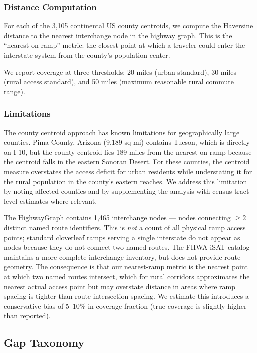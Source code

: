 \subsubsection{Distance Computation}

For each of the 3,105 continental US county centroids, we compute the Haversine distance to the nearest interchange node in the highway graph. This is the ``nearest on-ramp'' metric: the closest point at which a traveler could enter the interstate system from the county's population center.

We report coverage at three thresholds: 20 miles (urban standard), 30 miles (rural access standard), and 50 miles (maximum reasonable rural commute range).

\subsubsection{Limitations}

The county centroid approach has known limitations for geographically large counties. Pima County, Arizona (9,189 sq mi) contains Tucson, which is directly on I-10, but the county centroid lies 189 miles from the nearest on-ramp because the centroid falls in the eastern Sonoran Desert. For these counties, the centroid measure overstates the access deficit for urban residents while understating it for the rural population in the county's eastern reaches. We address this limitation by noting affected counties and by supplementing the analysis with census-tract-level estimates where relevant.

The HighwayGraph contains 1,465 interchange nodes --- nodes connecting $\geq 2$ distinct named route identifiers. This is \textit{not} a count of all physical ramp access points; standard cloverleaf ramps serving a single interstate do not appear as nodes because they do not connect two named routes. The FHWA iSAT catalog maintains a more complete interchange inventory, but does not provide route geometry. The consequence is that our nearest-ramp metric is the nearest point at which two named routes intersect, which for rural corridors approximates the nearest actual access point but may overstate distance in areas where ramp spacing is tighter than route intersection spacing. We estimate this introduces a conservative bias of 5--10\% in coverage fraction (true coverage is slightly higher than reported).

\subsection{Gap Taxonomy}

